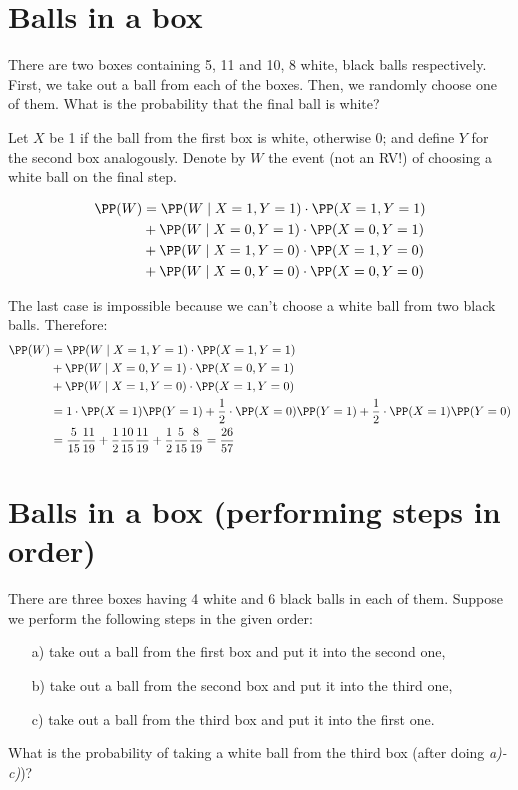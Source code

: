 \section{Balls in a box}
\begin{problem} %
There are two boxes containing {5, 11} and {10, 8} white, black balls
respectively. First, we take out a ball from each of the boxes. Then, we randomly choose one of them. What is the probability that the
final ball is white?
\end{problem}
\bigskip
\begin{solution}
Let $X$ be 1 if the ball from the first box is white, otherwise 0; and define $Y$ for the second box analogously. Denote by $W$ the event (not an RV!) of choosing a white ball on the final step.

\begin{align*}
    \PP(W) &= \PP(W\mid X=1, Y=1)\cdot \PP(X=1,Y=1) \\&+
\PP(W\mid X=0, Y=1)\cdot \PP(X=0,Y=1)\\&+
\PP(W\mid X=1, Y=0)\cdot \PP(X=1,Y=0)\\&+
\PP(W\mid X=0, Y=0)\cdot \PP(X=0,Y=0)
\end{align*}

The last case is impossible because we can't choose a white ball from two black balls. Therefore:
\begin{align*}
     \PP(W) &= \PP(W\mid X=1, Y=1)\cdot \PP(X=1,Y=1) \\&+
\PP(W\mid X=0, Y=1)\cdot \PP(X=0,Y=1)\\&+
\PP(W\mid X=1, Y=0)\cdot \PP(X=1,Y=0)\\&=
1\cdot \PP(X=1)\PP(Y=1) +\dfrac{1}{2}\cdot \PP(X=0)\PP(Y=1)+
\dfrac{1}{2}\cdot \PP(X=1)\PP(Y=0)\\&=
\dfrac{5}{15}\dfrac{11}{19}+\dfrac{1}{2}\dfrac{10}{15}\dfrac{11}{19}+
\dfrac{1}{2}\dfrac{5}{15}\dfrac{8}{19}=\dfrac{26}{57}
\end{align*}
\end{solution}

\section{Balls in a box (performing steps in order)}
\begin{problem} %
There are three boxes having 4 white and 6 black balls in each of them.
Suppose we perform the following steps in the given order:
    \begin{enumerate}
        \item[a) ] take out a ball from the first box and put it into the second one,
        \item[b) ] take out a ball from the second box and put it into the third one,
        \item[c) ] take out a ball from the third box and put it into the first one.
    \end{enumerate}
    What is the probability of taking a white ball from the third box (after doing \textit{a)-c)})?
\end{problem}
\bigskip

